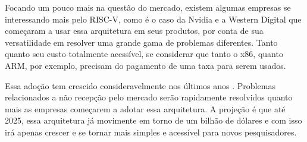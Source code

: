Focando um pouco mais na questão do mercado, existem algumas empresas se interessando mais pelo RISC-V, 
como é o caso da Nvidia \cite{Nvidia_Riscv} e a Western Digital \cite{WesternDigital_Riscv} que começaram a usar essa 
arquitetura em seus produtos, por conta de sua versatilidade em resolver uma grande gama de problemas 
diferentes. Tanto quanto seu custo totalmente acessível, se considerar que tanto o x86, quanto ARM, 
por exemplo, precisam do pagamento de uma taxa para serem usados.

Essa adoção tem crescido consideravelmente nos últimos anos \cite{RISCV_growth}. 
Problemas relacionados a não recepção pelo mercado serão rapidamente resolvidos quanto mais as empresas começarem 
a adotar essa arquitetura. A projeção é que até 2025, essa arquitetura já movimente em torno de um bilhão de 
dólares \cite{RISCV_market_growth} e com isso irá apenas crescer e se tornar mais simples e acessível para novos pesquisadores.
